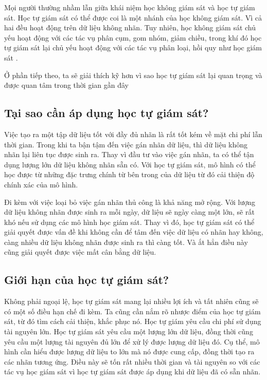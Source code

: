 Mọi người thường nhầm lẫn giữa khái niệm học không giám sát và học tự giám sát. Học tự giám sát có thể được coi là một nhánh của học không giám sát. Vì cả hai đều hoạt động trên dữ liệu không nhãn. Tuy nhiên, học không giám sát chủ yếu hoạt động với các tác vụ phân cụm, gom nhóm, giảm chiều, trong khí đó học tự giám sát lại chủ yếu hoạt động với các tác vụ phân loại, hồi quy như học giám sát \cite{ssl-genorcont}.

Ở phần tiếp theo, ta sẽ giải thích kỹ hơn vì sao học tự giám sát lại quan trọng và được quan tâm trong thời gian gần đây

\subsection{Tại sao cần áp dụng học tự giám sát?} 

\noindent Việc tạo ra một tập dữ liệu tốt với đầy đủ nhãn là rất tốt kém về mặt chi phí lẫn thời gian. Trong khi ta bận tậm đến việc gán nhãn dữ liệu, thì dữ liệu không nhãn lại liên tục được sinh ra. Thay vì đầu tư vào việc gán nhãn, ta có thể tận dụng lượng lớn dữ liệu không nhãn sẵn có. Với học tự giám sát, mô hình có thể học được từ những đặc trưng chính từ bên trong của dữ liệu từ đó cải thiện độ chính xác của mô hình. 

Đi kèm với việc loại bỏ việc gán nhãn thủ công là khả năng mở rộng. Với lượng dữ liệu không nhãn được sinh ra mỗi ngày, dữ liệu sẽ ngày càng một lớn, sẽ rất khó nếu sử dụng các mô hình học giám sát. Thay vì đó, học tự giám sát có thể giải quyết được vấn đề khi không cần để tâm đến việc dữ liệu có nhãn hay không, càng nhiều dữ liệu không nhãn được sinh ra thì càng tốt. Và ắt hẳn điều này cũng giải quyết được việc mất cân bằng dữ liệu.

\subsection{Giới hạn của học tự giám sát?}

\noindent Không phải ngoại lệ, học tự giám sát mang lại nhiều lợi ích và tất nhiên cũng sẽ có một số điều hạn chế đi kèm. Ta cũng cần nắm rõ nhược điểm của học tự giám sát, từ đó tìm cách cải thiện, khắc phục nó.
Học tự giám yêu cầu chi phí sử dụng tài nguyên lớn. Học tự giám sát yêu cầu một lượng lớn dữ liệu, đồng thời cũng yêu cầu một lượng tài nguyên đủ lớn để xử lý được lượng dữ liệu đó. Cụ thể, mô hình cần hiểu được lượng dữ liệu to lớn mà nó được cung cấp, đồng thời tạo ra các nhãn tương ứng. Điều này sẽ tốn rất nhiều thời gian và tài nguyên so với các tác vụ học giám sát vì học tự giám sát được áp dụng khi dữ liệu đã có sẵn nhãn.

